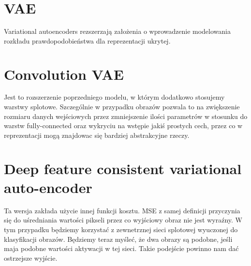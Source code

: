 \section{VAE}

Variational autoencoders rezszerzają założenia o wprowadzenie modelowania rozkładu prawdopodobieństwa dla reprezentacji ukrytej. 

\section{Convolution VAE}

Jest to rozszerzenie poprzedniego modelu, w którym dodatkowo stosujemy warstwy splotowe. Szczególnie w przypadku obrazów pozwala to na zwiększenie rozmiaru danych wejściowych przez zmniejszenie ilości parametrów w stosunku do warstw fully-connected oraz wykryciu na wstępie jakiś prostych cech, przez co w reprezentacji mogą znajdowac się bardziej abstrakcyjne rzeczy. 

\section{Deep feature consistent variational auto-encoder}

Ta wersja zakłada użycie innej funkcji kosztu. MSE z samej definicji przyczynia się do uśredniania wartości pikseli przez co wyjściowy obraz nie jest wyraźny. W tym przypadku będziemy korzystać z zewnetrznej sieci splotowej wyuczonej do klasyfikacji obrazów. Będziemy teraz myśleć, że dwa obrazy są podobne, jeśli maja podobne wartości aktywacji w tej sieci. Takie podejście powinno nam dać ostrzejsze wyjście.
